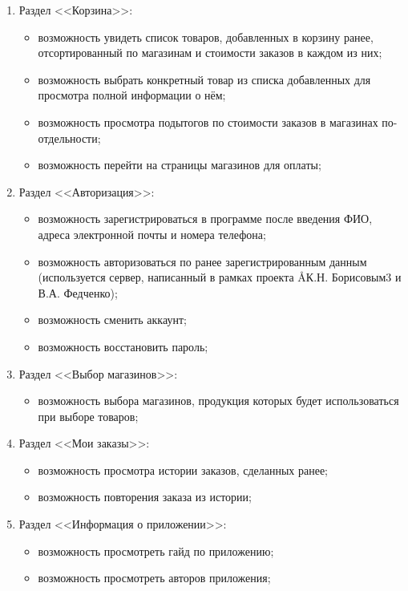 \documentclass[a4paper,12pt,reqno]{article}
\begin{document}
\begin{enumerate}
    \item Раздел <<Корзина>>:
    \begin{itemize}
      \item возможность увидеть список товаров, добавленных в корзину ранее, отсортированный по магазинам и стоимости заказов в каждом из них;
      \item возможность выбрать конкретный товар из списка добавленных для просмотра полной информации о нём;
      \item возможность просмотра подытогов по стоимости заказов в магазинах по-отдельности;
      \item возможность перейти на страницы магазинов для оплаты;
    \end{itemize}
    \item Раздел <<Авторизация>>:
    \begin{itemize}
      \item возможность зарегистрироваться в программе после введения ФИО, адреса электронной почты и номера телефона;
      \item возможность авторизоваться по ранее зарегистрированным данным (используется сервер, написанный в рамках проекта \AA{К.Н. Борисовым}{3} и В.А. Федченко);
      \item возможность сменить аккаунт;
      \item возможность восстановить пароль;
    \end{itemize}
    \item Раздел <<Выбор магазинов>>:
    \begin{itemize}
      \item возможность выбора магазинов, продукция которых будет использоваться при выборе товаров;
    \end{itemize}
    \item Раздел <<Мои заказы>>:
    \begin{itemize}
      \item возможность просмотра истории заказов, сделанных ранее;
      \item возможность повторения заказа из истории;
    \end{itemize}
    \item Раздел <<Информация о приложении>>:
    \begin{itemize}
      \item возможность просмотреть гайд по приложению;
      \item возможность просмотреть авторов приложения;
    \end{itemize}
  \end{enumerate}
\end{document}
